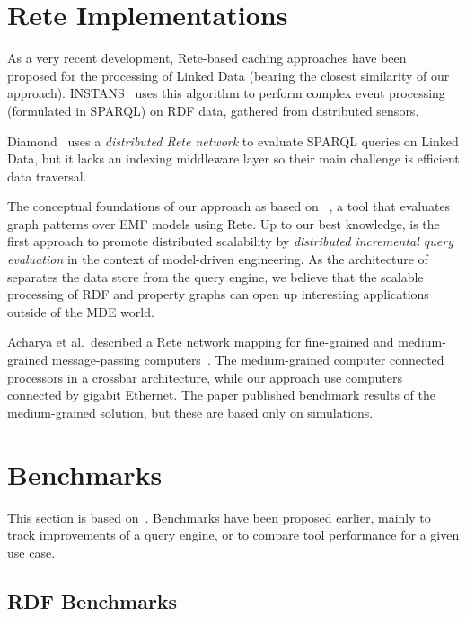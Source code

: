 \section{Rete Implementations}


As a very recent development, Rete-based caching approaches have been proposed for the processing of Linked Data (bearing the closest similarity of our approach). \mbox{INSTANS}~\cite{INSTANS2012} uses this algorithm to perform complex event processing (formulated in SPARQL) on RDF data, gathered from distributed sensors.

Diamond~\cite{miranker2012diamond} uses a \emph{distributed Rete network} to evaluate SPARQL queries on Linked Data, but it lacks an indexing middleware layer so their main challenge is efficient data traversal.

The conceptual foundations of our approach as based on \eiq{}~\cite{models10}, a tool that evaluates graph patterns over EMF models using Rete. Up to our best knowledge, \iqd{} is the first approach to promote distributed scalability by \emph{distributed incremental query evaluation} in the context of model-driven engineering. As the architecture of \iqd{} separates the data store from the query engine, we believe that the scalable processing of RDF and property graphs can open up interesting applications outside of the MDE world.

Acharya et al.\ described a Rete network mapping for fine-grained and medium-grained message-passing computers~\cite{message-passing-rete}. The medium-grained computer connected processors in a crossbar architecture, while our approach use computers connected by gigabit Ethernet. The paper published benchmark results of the medium-grained solution, but these are based only on simulations.

\section{Benchmarks}

This section is based on~\cite{ASE2013}. Benchmarks have been proposed earlier, mainly to track improvements of a query engine, or to compare tool performance for a given use case. 

\subsection{RDF Benchmarks}

